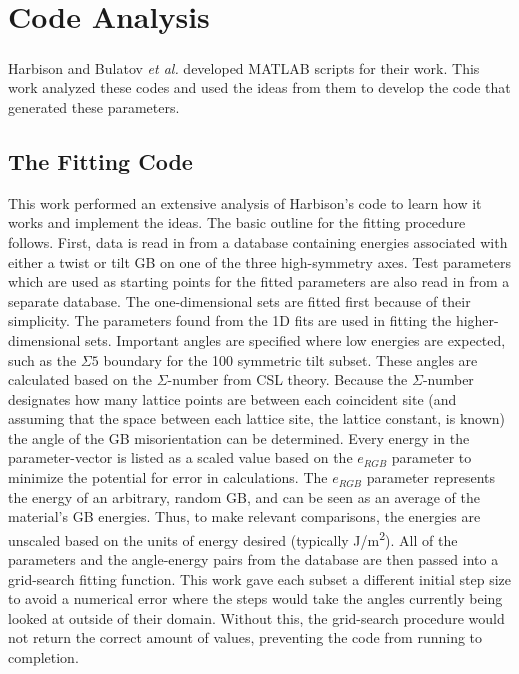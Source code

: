 \documentclass[12pt]{report}
\begin{document}
\section{Code Analysis\label{methods:code}}
Harbison\cite{harbison2015} and Bulatov \emph{et al.}\cite{bulatov2014} developed MATLAB\textsuperscript{\textregistered} scripts for their work.  This work analyzed these codes and used the ideas from them to develop the code that generated these parameters.

\subsection{The Fitting Code\label{code:fitting}}
This work performed an extensive analysis of Harbison's\cite{harbison2015} code to learn how it works and implement the ideas.  The basic outline for the fitting procedure follows.  First, data is read in from a database containing energies associated with either a twist or tilt GB on one of the three high-symmetry axes.  Test parameters which are used as starting points for the fitted parameters are also read in from a separate database.  The one-dimensional sets are fitted first because of their simplicity.  The parameters found from the 1D fits are used in fitting the higher-dimensional sets.  Important angles are specified where low energies are expected, such as the $\Sigma5$ boundary for the \textlangle{}100\textrangle{} symmetric tilt subset.  These angles are calculated based on the $\Sigma$-number from CSL theory. Because the $\Sigma$-number designates how many lattice points  are between each coincident site (and assuming that the space between each lattice site, the lattice constant, is known) the angle of the GB misorientation can be determined.  Every energy in the parameter-vector is listed as a scaled value based on the $e_{RGB}$ parameter to minimize the potential for error in calculations. The $e_{RGB}$ parameter represents the energy of an arbitrary, random GB, and can be seen as an average of the material's GB energies.  Thus, to make relevant comparisons, the energies are unscaled based on the units of energy desired (typically J/m\textsuperscript{2}).  All of the parameters and the angle-energy pairs from the database are then passed into a grid-search fitting function.  This work gave each subset a different initial step size to avoid a numerical error where the steps would take the angles currently being looked at outside of their domain. Without this, the grid-search procedure would not return the correct amount of values, preventing the code from running to completion.
\end{document}
